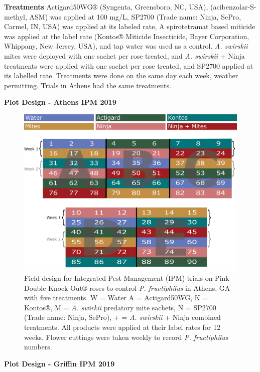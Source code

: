 \documentclass{ufdissertation}[overrideChapters] %
\begin{document}
{\textbf{Treatments}
Actigard50WG® (Syngenta, Greensboro, NC, USA), (acibenzolar-S-methyl, ASM) was applied at 100 \si{\milli\gram}/\si{\liter}, SP2700 (Trade name: Ninja\texttrademark, SePro, Carmel, IN, USA) was applied at its labeled rate, A spirotetramat based miticide was applied at the label rate (Kontos® Miticide Insecticide, Bayer Corporation, Whippany, New Jersey, USA), and tap water was used as a control. \emph{A. swirskii} mites were deployed with one sachet per rose treated, and \emph{A. swirskii} + Ninja treatments were applied with one sachet per rose treated, and SP2700 applied at its labelled rate. Treatments were done on the same day each week, weather permitting. Trials in Athens had the same treatments.

\textbf{Plot Design - Athens IPM 2019}
\begin{figure}

{\centering \includegraphics[width=1\linewidth]{figure/rrv_ipm_plot_map_2019_athens} 

}

\caption[Field design for Integrated Pest Management (IPM) trials on Pink Double Knock Out® roses to control \textit{P. fructiphilus} in Athens, GA with five treatments]{Field design for Integrated Pest Management (IPM) trials on Pink Double Knock Out® roses to control \textit{P. fructiphilus} in Athens, GA with five treatments. W = Water A = Actigard50WG, K = Kontos®, M = \textit{A. swirkii} predatory mite sachets, N = SP2700 (Trade name: Ninja, SePro), + = \textit{A. swirskii} + Ninja combined treatments. All products were applied at their label rates for 12 weeks. Flower cuttings were taken weekly to record \textit{P. fructiphilus} numbers.}\label{fig:athens-ipm-2019}
\end{figure}
\textbf{Plot Design - Griffin IPM 2019}
\begin{figure}


\end{figure}}
\end{document}
